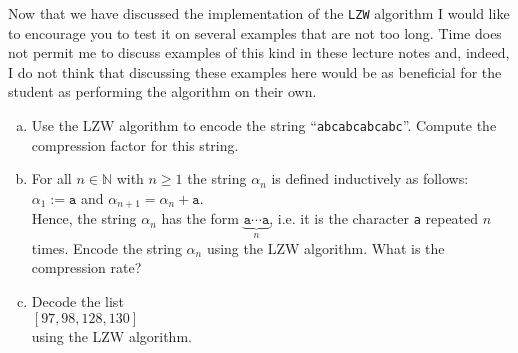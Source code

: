 Now that we have discussed the implementation of the \texttt{LZW} algorithm I would like to
encourage you to test it on several examples that are not too long.  Time does not permit me
to discuss examples of this kind in these lecture notes and, indeed, I do not think that discussing
these examples here would be as beneficial for the student as performing the algorithm on their own.

\exercise
\begin{enumerate}[(a)]
\item Use the LZW algorithm to encode the string ``\texttt{abcabcabcabc}''.  Compute the compression
      factor for this string.
\item For all $n \in \mathbb{N}$ with $n \geq 1$ the string $\alpha_n$ is defined inductively as
      follows:
      \\[0.2cm]
      \hspace*{1.3cm} $\alpha_1 := \mathtt{a}$ \quad and \quad $\alpha_{n+1} = \alpha_n + \mathtt{a}$.
      \\[0.2cm]
      Hence, the string $\alpha_n$ has the form $\underbrace{\mathtt{a} \cdots \mathtt{a}}_n$,
      i.e. it is the character \texttt{a} repeated $n$ times.
      Encode the string $\alpha_n$ using the LZW algorithm.  What is the compression rate?
\item Decode the list 
      \\[0.2cm]
      \hspace*{1.3cm}
      $[97, 98, 128, 130]$
      \\[0.2cm]
      using the LZW algorithm.  \eox
\end{enumerate}


